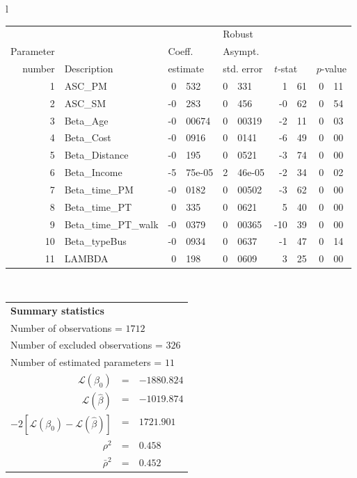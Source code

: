   \begin{tabular}{l}
\begin{tabular}{rlr@{.}lr@{.}lr@{.}lr@{.}l}
         &                       &   \multicolumn{2}{l}{}    & \multicolumn{2}{l}{Robust}  &     \multicolumn{4}{l}{}   \\
Parameter &                       &   \multicolumn{2}{l}{Coeff.}      & \multicolumn{2}{l}{Asympt.}  &     \multicolumn{4}{l}{}   \\
number &  Description                     &   \multicolumn{2}{l}{estimate}      & \multicolumn{2}{l}{std. error}  &   \multicolumn{2}{l}{$t$-stat}  &   \multicolumn{2}{l}{$p$-value}   \\

\hline

1 & ASC_PM  & 0&532 & 0&331 & 1&61 & 0&11\\
2 & ASC_SM & -0&283 & 0&456 & -0&62 & 0&54\\
3 & Beta_Age & -0&00674 & 0&00319 & -2&11 & 0&03\\
4 & Beta_Cost & -0&0916 & 0&0141 & -6&49 & 0&00\\
5 & Beta_Distance & -0&195 & 0&0521 & -3&74 & 0&00\\
6 & Beta_Income & -5&75e-05 & 2&46e-05 & -2&34 & 0&02\\
7 & Beta_time_PM & -0&0182 & 0&00502 & -3&62 & 0&00\\
8 & Beta_time_PT & 0&335 & 0&0621 & 5&40 & 0&00\\
9 & Beta_time_PT_walk & -0&0379 & 0&00365 & -10&39 & 0&00\\
10 & Beta_typeBus & -0&0934 & 0&0637 & -1&47 & 0&14\\
11 & LAMBDA & 0&198 & 0&0609 & 3&25 & 0&00\\
\hline
\end{tabular}
\\
\begin{tabular}{rcl}
\multicolumn{3}{l}{\bf Summary statistics}\\
\multicolumn{3}{l}{ Number of observations = $1712$} \\
\multicolumn{3}{l}{ Number of excluded observations = $326$} \\
\multicolumn{3}{l}{ Number of estimated  parameters = $11$} \\
 $\mathcal{L}(\beta_0)$ &=&  $-1880.824$ \\
 $\mathcal{L}(\hat{\beta})$ &=& $-1019.874 $  \\
 $-2[\mathcal{L}(\beta_0) -\mathcal{L}(\hat{\beta})]$ &=& $1721.901$ \\
    $\rho^2$ &=&   $0.458$ \\
    $\bar{\rho}^2$ &=&    $0.452$ \\
\end{tabular}
  \end{tabular}
